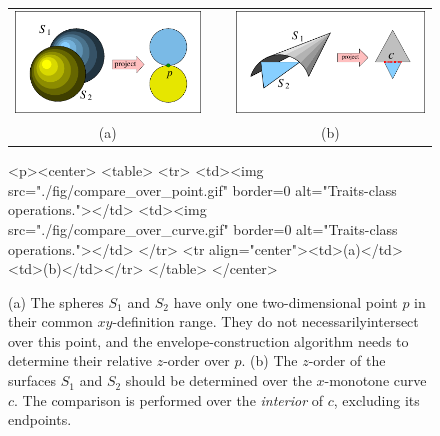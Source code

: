 \begin{figure}[t]
\begin{ccTexOnly}
  \begin{center}
  \begin{tabular}{ccc}
    \includegraphics{Envelope_3/fig/compare_over_point} & ~ &
    \includegraphics{Envelope_3/fig/compare_over_curve} \\
    {\small (a)} & ~ & {\small (b)}
  \end{tabular}
  \end{center}
\end{ccTexOnly}
\begin{ccHtmlOnly}
  <p><center>
  <table>
  <tr>
  <td><img src="./fig/compare_over_point.gif" border=0 alt="Traits-class operations."></td>
  <td><img src="./fig/compare_over_curve.gif" border=0 alt="Traits-class operations."></td>
  </tr>
  <tr align="center"><td>(a)</td><td>(b)</td></tr>
  </table>
  </center>
\end{ccHtmlOnly}
\caption{(a) The spheres $S_1$ and $S_2$ have only one
two-dimensional point $p$ in their common $xy$-definition range. They
do not necessarilyintersect over this point, and the
envelope-construction algorithm needs to determine their relative
$z$-order over $p$. (b) The $z$-order of the surfaces $S_1$ and $S_2$
should be determined over the $x$-monotone curve $c$. The comparison
is performed over the {\em interior} of $c$, excluding its
endpoints.\label{env3_fig:comp_over}}
\end{figure}

